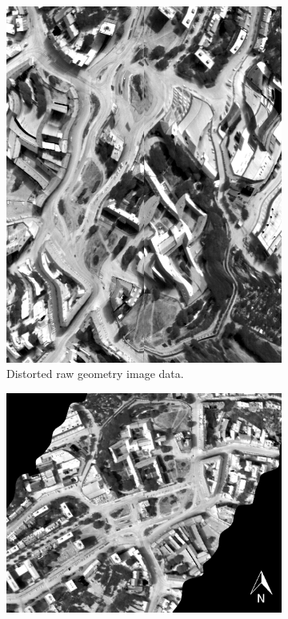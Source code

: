 \begin{figure}[thb]
	\centering
	\vspace{1em}
	\begin{subfigure}[t]{.38\linewidth}
		\centering
		\includegraphics[scale=0.24]{pics/Chapter_02/TASIcalibrated.png}
		\caption{Distorted raw geometry image data.}
		\label{fig:ResponseFunctions}
	\end{subfigure}
	\hspace{2em}
	\begin{subfigure}[t]{.52\linewidth}
		\centering
		\includegraphics[scale=1]{pics/Chapter_02/TASIgeoreferencedcut.png}

\end{subfigure}
\end{figure}
